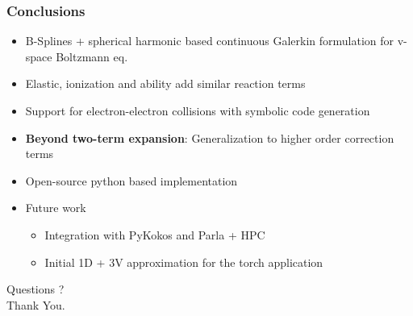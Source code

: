 \documentclass[mathserif, aspectratio=169]{beamer}
\begin{document}
\begin{frame}
	\frametitle{Conclusions}
	\begin{itemize}
		\item B-Splines + spherical harmonic based continuous Galerkin formulation for v-space Boltzmann eq.
		\item Elastic, ionization and ability add similar reaction terms
		\item Support for electron-electron collisions with symbolic code generation
		\item \textbf{Beyond two-term expansion}: Generalization to higher order correction terms 
		\item Open-source python based implementation
		\item Future work
		\begin{itemize}
			\item Integration with PyKokos and Parla + HPC 
			\item Initial 1D + 3V approximation for the torch application
		\end{itemize}
	\end{itemize}
\end{frame}

\begin{frame}
	\centering
	\Huge Questions ? \\
	\centering
	\Huge Thank You. 
\end{frame}
\end{document}
